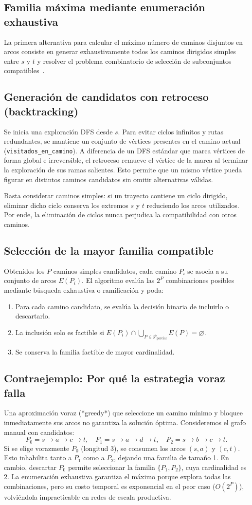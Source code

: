 \documentclass[11pt,a4paper]{article}
\newcommand{\tema}[1]{\subsection*{\color{verde}#1}}
\begin{document}
\subsection{Familia máxima mediante enumeración exhaustiva}
La primera alternativa para calcular el máximo número de caminos disjuntos en arcos consiste en generar exhaustivamente todos los caminos dirigidos simples entre $s$ y $t$ y resolver el problema combinatorio de selección de subconjuntos compatibles~\cite{sedgewick}.

\tema{Generación de candidatos con retroceso (backtracking)}
Se inicia una exploración DFS desde $s$. Para evitar ciclos infinitos y rutas redundantes, se mantiene un conjunto de vértices presentes en el camino actual (\texttt{visitados\_en\_camino}). A diferencia de un DFS estándar que marca vértices de forma global e irreversible, el retroceso remueve el vértice de la marca al terminar la exploración de sus ramas salientes. Esto permite que un mismo vértice pueda figurar en distintos caminos candidatos sin omitir alternativas válidas.

Basta considerar caminos simples: si un trayecto contiene un ciclo dirigido, eliminar dicho ciclo conserva los extremos $s$ y $t$ reduciendo los arcos utilizados. Por ende, la eliminación de ciclos nunca perjudica la compatibilidad con otros caminos.

\tema{Selección de la mayor familia compatible}
Obtenidos los $P$ caminos simples candidatos, cada camino $P_i$ se asocia a su conjunto de arcos $E(P_i)$. El algoritmo evalúa las $2^P$ combinaciones posibles mediante búsqueda exhaustiva o ramificación y poda:
\begin{enumerate}
  \item Para cada camino candidato, se evalúa la decisión binaria de incluirlo o descartarlo.
  \item La inclusión solo es factible si $E(P_i) \cap \bigcup_{P \in \mathcal{P}_{\text{parcial}}} E(P) = \varnothing$.
  \item Se conserva la familia factible de mayor cardinalidad.
\end{enumerate}

\tema{Contraejemplo: Por qué la estrategia voraz falla}
Una aproximación voraz (*greedy*) que seleccione un camino mínimo y bloquee inmediatamente sus arcos no garantiza la solución óptima. Consideremos el grafo manual con candidatos:
\[
  P_0 = s \to a \to c \to t, \quad P_1 = s \to a \to d \to t, \quad P_2 = s \to b \to c \to t.
\]
Si se elige vorazmente $P_0$ (longitud 3), se consumen los arcos $(s, a)$ y $(c, t)$. Esto inhabilita tanto a $P_1$ como a $P_2$, dejando una familia de tamaño 1. En cambio, descartar $P_0$ permite seleccionar la familia $\{P_1, P_2\}$, cuya cardinalidad es 2. La enumeración exhaustiva garantiza el máximo porque explora todas las combinaciones, pero su costo temporal es exponencial en el peor caso ($O(2^P)$), volviéndola impracticable en redes de escala productiva.
\end{document}
